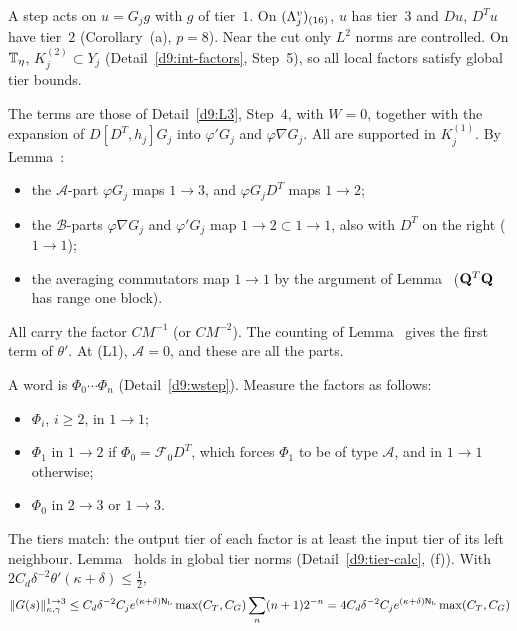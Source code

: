 \begin{detail}\label{d9:tier-walk}
\begin{step}
A step acts on $u=G_jg$ with $g$ of tier~$1$. On $(\Lambda^v_j)_{(16)}$, $u$ has tier~$3$ and $Du$, $D^Tu$ have tier~$2$ (Corollary~(a), $p=8$). Near the cut only $L^2$ norms are controlled. On $\mathbb T_\eta$, $K_j^{(2)}\subset Y_j$ (Detail~\ref{d9:int-factors}, Step~5), so all local factors satisfy global tier bounds.
\end{step}
\begin{step}
The terms are those of Detail~\ref{d9:L3}, Step~4, with $W=0$, together with the expansion of $D[D^T,h_j]G_j$ into $\varphi'G_j$ and $\varphi\nabla G_j$. All are supported in $K_j^{(1)}$. By Lemma~:
\begin{itemize}
\item the $\mathcal A$-part $\varphi G_j$ maps $1\to3$, and $\varphi G_jD^T$ maps $1\to2$;
\item the $\mathcal B$-parts $\varphi\nabla G_j$ and $\varphi'G_j$ map $1\to2\subset1\to1$, also with $D^T$ on the right ($1\to1$);
\item the averaging commutators map $1\to1$ by the argument of Lemma~ ($\mathbf Q^T\mathbf Q$ has range one block).
\end{itemize}
All carry the factor $CM^{-1}$ (or $CM^{-2}$). The counting of Lemma~ gives the first term of $\theta'$. At (L1), $\mathcal A=0$, and these are all the parts.
\end{step}
\begin{step}
A word is $\Phi_0\cdots\Phi_n$ (Detail~\ref{d9:wstep}). Measure the factors as follows:
\begin{itemize}
\item $\Phi_i$, $i\ge2$, in $1\to1$;
\item $\Phi_1$ in $1\to2$ if $\Phi_0=\mathcal F_0D^T$, which forces $\Phi_1$ to be of type $\mathcal A$, and in $1\to1$ otherwise;
\item $\Phi_0$ in $2\to3$ or $1\to3$.
\end{itemize}
The tiers match: the output tier of each factor is at least the input tier of its left neighbour. Lemma~ holds in global tier norms (Detail~\ref{d9:tier-calc}, (f)). With $2C_d\delta^{-2}\theta'(\kappa+\delta)\le\frac12$,
\[
\|G(s)\|^{1\to3}_{\kappa,\gamma}\le C_d\delta^{-2}C_je^{(\kappa+\delta)\mathsf N_{\rm b}}\max(C_T,C_G)\sum_n(n+1)2^{-n}=4C_d\delta^{-2}C_je^{(\kappa+\delta)\mathsf N_{\rm b}}\max(C_T,C_G)
\]
\end{step}
\end{detail}
